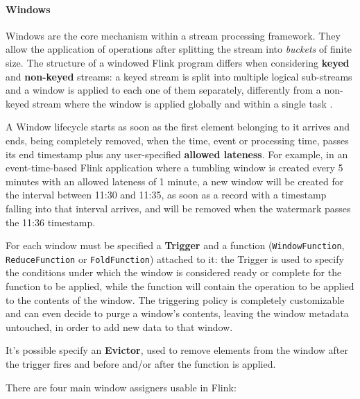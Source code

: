 \paragraph{Windows}

Windows are the core mechanism within a stream processing framework. They allow the application of operations after splitting the stream into \textit{buckets} of finite size. The structure of a windowed Flink program differs when considering \textbf{keyed} and \textbf{non-keyed} streams: a keyed stream is split into multiple logical sub-streams and a window is applied to each one of them separately, differently from a non-keyed stream where the window is applied globally and within a single task \cite{flink_windows}.

A Window lifecycle starts as soon as the first element belonging to it arrives and ends, being completely removed, when the time, event or processing time, passes its end timestamp plus any user-specified \textbf{allowed lateness}. For example, in an event-time-based Flink application where a tumbling window is created every 5 minutes with an allowed lateness of 1 minute, a new window will be created for the interval between 11:30 and 11:35, as soon as a record with a timestamp falling into that interval arrives, and will be removed when the watermark passes the 11:36 timestamp.

For each window must be specified a \textbf{Trigger} and a function (\texttt{WindowFunction}, \texttt{ReduceFunction} or \texttt{FoldFunction}) attached to it: the Trigger is used to specify the conditions under which the window is considered ready or complete for the function to be applied, while the function will contain the operation to be applied to the contents of the window. The triggering policy is completely customizable and can even decide to purge a window’s contents, leaving the window metadata untouched, in order to add new data to that window.

It's possible specify an \textbf{Evictor}, used to remove elements from the window after the trigger fires and before and/or after the function is applied.

There are four main window assigners usable in Flink:

